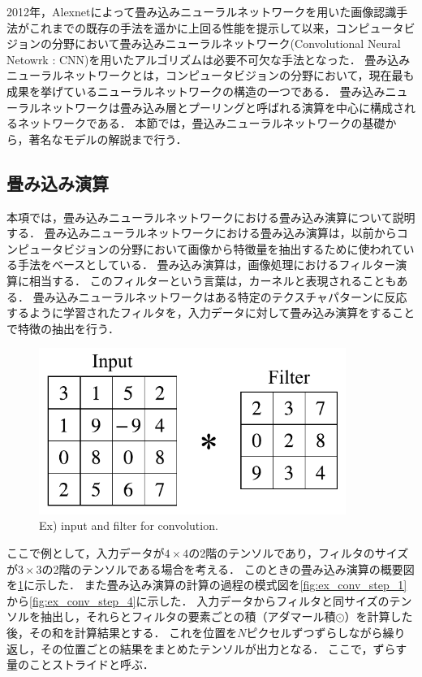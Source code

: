 2012年，Alexnet\cite{krizhevsky2012imagenet}によって畳み込みニューラルネットワークを用いた画像認識手法がこれまでの既存の手法を遥かに上回る性能を提示して以来，コンピュータビジョンの分野において畳み込みニューラルネットワーク(Convolutional Neural Netowrk : CNN)を用いたアルゴリズムは必要不可欠な手法となった．
畳み込みニューラルネットワークとは，コンピュータビジョンの分野において，現在最も成果を挙げているニューラルネットワークの構造の一つである．
畳み込みニューラルネットワークは畳み込み層とプーリングと呼ばれる演算を中心に構成されるネットワークである．
本節では，畳込みニューラルネットワークの基礎から，著名なモデルの解説まで行う．

\subsection{畳み込み演算}
    本項では，畳み込みニューラルネットワークにおける畳み込み演算について説明する．
    畳み込みニューラルネットワークにおける畳み込み演算は，以前からコンピュータビジョンの分野において画像から特徴量を抽出するために使われている手法をベースとしている．
    畳み込み演算は，画像処理におけるフィルター演算に相当する．
    このフィルターという言葉は，カーネルと表現されることもある．
    畳み込みニューラルネットワークはある特定のテクスチャパターンに反応するように学習されたフィルタを，入力データに対して畳み込み演算をすることで特徴の抽出を行う．
    \begin{figure}[ht]
      \centering
      \includegraphics[width=10cm]{8_appendix/img/conv.pdf}
      \caption{Ex) input and filter for convolution.}
      \label{fig:ex_conv_input_filter}
    \end{figure}
    
    ここで例として，入力データが$4 \times 4$の2階のテンソルであり，フィルタのサイズが$3 \times 3$の2階のテンソルである場合を考える．
    このときの畳み込み演算の概要図を\ref{fig:ex_conv_input_filter}に示した．
    また畳み込み演算の計算の過程の模式図を\ref{fig:ex_conv_step_1}から\ref{fig:ex_conv_step_4}に示した．
    入力データからフィルタと同サイズのテンソルを抽出し，それらとフィルタの要素ごとの積（アダマール積$\odot$）を計算した後，その和を計算結果とする．
    これを位置を$N$ピクセルずつずらしながら繰り返し，その位置ごとの結果をまとめたテンソルが出力となる．
    ここで，ずらす量のことストライドと呼ぶ．
    
